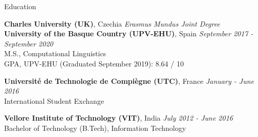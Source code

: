 \documentclass{resume}
\begin{document}



\begin{rSection}{Education}

    {\bf Charles University (UK)}, Czechia \hfill 
        {\em Erasmus Mundus Joint Degree}\\
    {\bf University of the Basque Country (UPV-EHU)}, Spain \hfill 
        {\em September 2017 - September 2020}\\
            M.S., Computational Linguistics\\
            GPA, UPV-EHU (Graduated September 2019): 8.64 / 10%
    
    {\bf Universit\'e de Technologie de Compi\`egne (UTC)}, France \hfill
        {\em January - June 2016}\\
            International Student Exchange
            
    {\bf Vellore Institute of Technology (VIT)}, India \hfill
        {\em July 2012 - June 2016}\\
            Bachelor of Technology (B.Tech), Information Technology
    
\end{rSection}

\end{document}
